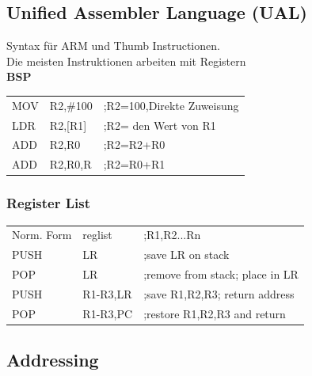 \begin{multicols}{2}
    \begin{minipage}{\linewidth}
        \subsection{Unified Assembler Language (UAL)}
        Syntax für ARM und Thumb Instructionen.\\
        Die meisten Instruktionen arbeiten mit Registern\\
        \textbf{BSP}\newline
        \begin{tabular}{lll}
            MOV&R2,\#100  &;R2=100,Direkte Zuweisung  \\ 
            LDR&R2,[R1]   &;R2= den Wert von R1  \\ 
            ADD&R2,R0     &;R2=R2+R0  \\ 
            ADD&R2,R0,R   &;R2=R0+R1  \\ 
        \end{tabular} 
    \end{minipage}
    
    \begin{minipage}{0.8\linewidth}
        \subsubsection{Register List}
        \begin{tabular}{lll}
            Norm. Form&{reglist}  &;{R1,R2...Rn}  \\ 
            PUSH& {LR} & ;save LR on stack\\ 
            POP&  {LR}&  ;remove from stack; place in LR\\  
            PUSH& {R1-R3,LR} & ;save R1,R2,R3; return address\\  
            POP& {R1-R3,PC} &;restore R1,R2,R3 and return \\ 
        \end{tabular} 
    \end{minipage}
\end{multicols}

\subsection{Addressing}
